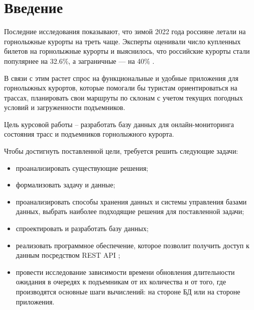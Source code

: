 \chapter*{Введение}

Последние исследования показывают, что зимой 2022 года россияне летали на горнолыжные курорты на треть чаще. Эксперты оценивали число купленных билетов на горнолыжные курорты и выяснилось, что российские курорты стали популярнее на 32.6\%, а заграничные — на 40\% \cite{stat}.

В связи с этим растет спрос на функциональные и удобные приложения для горнолыжных курортов, которые помогали бы туристам ориентироваться на трассах, планировать свои маршруты по склонам с учетом текущих погодных условий и загруженности подъемников.

Цель курсовой работы -- разработать базу данных для онлайн-мониторинга состояния трасс и подъемников горнолыжного курорта. 



Чтобы достигнуть поставленной цели, требуется решить следующие задачи:

\begin{itemize}
	\item проанализировать существующие решения;
	\item формализовать задачу и данные;
	\item проанализировать способы хранения данных и системы управления базами данных, выбрать наиболее подходящие решения для поставленной задачи;
	\item спроектировать и разработать базу данных;
    \item  реализовать программное обеспечение, которое позволит получить доступ к данным посредством REST API \cite{api};
    \item провести исследование зависимости времени обновления длительности ожидания в очередях к подъемникам от их количества и от того, где производятся основные шаги вычислений: на стороне БД или на стороне приложения.
\end{itemize}

